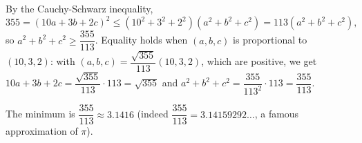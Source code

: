 By the Cauchy-Schwarz inequality,
\[355=\left(10a+3b+2c\right)^2\le\left(10^2+3^2+2^2\right)\left(a^2+b^2+c^2\right)=113\left(a^2+b^2+c^2\right),\]
so $a^2+b^2+c^2\ge\dfrac{355}{113}$. Equality holds when $(a,b,c)$ is proportional to $(10,3,2)$: with $(a,b,c)=\dfrac{\sqrt{355}}{113}(10,3,2)$, which are positive, we get $10a+3b+2c=\dfrac{\sqrt{355}}{113}\cdot113=\sqrt{355}$ and $a^2+b^2+c^2=\dfrac{355}{113^2}\cdot113=\dfrac{355}{113}$.

The minimum is $\boxed{\dfrac{355}{113}\approx3.1416}$ (indeed $\dfrac{355}{113}=3.14159292\ldots$, a famous approximation of $\pi$).
